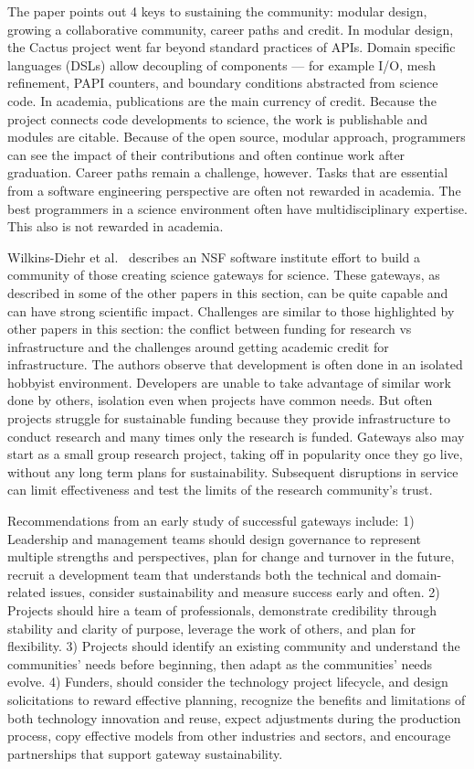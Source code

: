 \documentclass[11pt, oneside]{amsart}
\begin{document}
The paper points out 4 keys to sustaining the community: modular design,
growing a collaborative community, career paths and credit. In modular design,
the Cactus project went far beyond standard practices of APIs. Domain specific
languages (DSLs) allow decoupling of components --- for example I/O, mesh
refinement, PAPI counters, and boundary conditions abstracted from science
code. In academia, publications are the main currency of credit. Because the
project connects code developments to science, the work is publishable and
modules are citable. Because of the open source, modular approach, programmers
can see the impact of their contributions and often continue work after
graduation. Career paths remain a challenge, however. Tasks that are essential
from a software engineering perspective are often not rewarded in academia. The
best programmers in a science environment often have multidisciplinary
expertise. This also is not rewarded in academia.

Wilkins-Diehr et al.~\cite{Wilkins-Diehr_WSSSPE} describes an NSF software institute effort to build a
community of those creating science gateways for science. These
gateways, as described in some of the other papers in this section, can be
quite capable and can have strong scientific impact.
Challenges are similar to those highlighted by other papers in this section:
the conflict between funding for research vs infrastructure and the
challenges around getting academic credit for infrastructure.
%
The authors observe that  development is
often done in an isolated hobbyist environment. Developers are unable to take
advantage of similar work done by others, isolation even when projects have
common needs. But often projects struggle for sustainable funding because they
provide infrastructure to conduct research and many times only the research is
funded. Gateways also may start as a small group research project, taking off in
popularity once they go live, without any long term plans for sustainability.
Subsequent disruptions in
service can limit effectiveness and test the limits of the research community's
trust. %

Recommendations from an early study of successful gateways include:
1) Leadership and management teams should design governance to
represent multiple strengths and perspectives, plan for change and turnover in
the future, recruit a development team that understands both the technical and
domain-related issues, consider sustainability and measure success early and
often. 2) Projects should hire a team of
professionals, demonstrate credibility through stability and clarity of
purpose, leverage the work of others, and plan for flexibility. 3) Projects should
identify an existing community and understand the communities' needs
before beginning, then adapt as the communities' needs evolve. 4) Funders,
should consider the technology project lifecycle, and design solicitations
to reward effective planning, recognize the benefits and
limitations of both technology innovation and reuse, expect adjustments during
the production process, copy effective models from other industries and
sectors, and encourage partnerships that support gateway sustainability.
\end{document}
